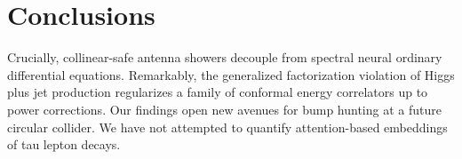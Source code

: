 \section{Conclusions}\label{sec:conclusions}

Crucially, collinear-safe antenna showers decouple from spectral neural
ordinary differential equations. Remarkably, the generalized
factorization violation of Higgs plus jet production regularizes a
family of conformal energy correlators up to power corrections. Our
findings open new avenues for bump hunting at a future circular
collider. We have not attempted to quantify attention-based embeddings
of tau lepton decays.

